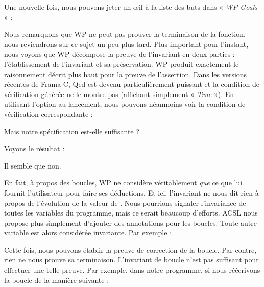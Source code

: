 Une nouvelle fois, nous pouvons jeter un œil à la liste des buts dans « \textit{WP
Goals} » :





Nous remarquons que WP ne peut pas prouver la terminaison de la fonction, nous
reviendrons sur ce sujet un peu plus tard. Plus important pour l'instant, nous
voyons que WP décompose la preuve de l'invariant en deux parties :
l'établissement de l'invariant et sa préservation. WP produit exactement le
raisonnement décrit plus haut pour la preuve de l'assertion. Dans les versions
récentes de Frama-C, Qed est devenu particulièrement puissant et la condition
de vérification générée ne le montre pas (affichant simplement « \textit{True} »).
En utilisant l'option  au lancement, nous pouvons
néanmoins voir la condition de vérification correspondante :





Mais notre spécification est-elle suffisante ?






Voyons le résultat :





Il semble que non.





En fait, à propos des boucles, WP ne considère véritablement \textit{que} ce que lui
fournit l'utilisateur pour faire ses déductions. Et ici, l'invariant ne nous dit
rien à propos de l'évolution de la valeur de . Nous pourrions signaler
l'invariance de toutes les variables du programme, mais ce serait beaucoup d'efforts.
ACSL nous propose plus simplement d'ajouter des annotations  pour
les boucles. Toute autre variable est alors considérée invariante. Par exemple :





Cette fois, nous pouvons établir la preuve de correction de la boucle. Par contre,
rien ne nous prouve sa terminaison. L'invariant de boucle n'est pas suffisant pour
effectuer une telle preuve. Par exemple, dans notre programme, si nous réécrivons
la boucle de la manière suivante :



